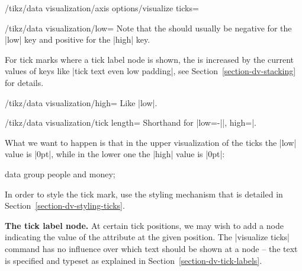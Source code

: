 \begin{key}{/tikz/data visualization/axis options/visualize ticks=}
\begin{itemize}
\begin{key}{/tikz/data visualization/low=}
                Note that the  should usually be negative for
                the |low| key and positive for the |high| key.

                For tick marks where a tick label node is shown, the
                 is increased by the current values of keys
                like |tick text even low padding|, see
                Section~\ref{section-dv-stacking} for details.
            \end{key}
            \begin{key}{/tikz/data visualization/high=}
                Like |low|.
            \end{key}
            \begin{key}{/tikz/data visualization/tick length=}
                Shorthand for |low=-||, high=|.
            \end{key}

            What we want to happen is that in the upper visualization of the
            ticks the |low| value is |0pt|, while in the lower one the |high|
            value is |0pt|:
\begin{codeexample}[preamble={\usetikzlibrary{datavisualization}}]
%
\tikz \datavisualization [
    our system,
    x axis={attribute=time, length=3cm, ticks=many},
    left axis ={attribute=money},
    right axis={attribute=people},
    visualize as line/.list={people 1, people 2, money 1, money 2}]
  data group {people and money};
\end{codeexample}
    \end{itemize}
    In order to style the tick mark, use the styling mechanism that is detailed
    in Section~\ref{section-dv-styling-ticks}.


    \medskip
    \textbf{The tick label node.}
    At certain tick positions, we may wish to add a node indicating the value
    of the attribute at the given position. The |visualize ticks| command has
    no influence over which text should be shown at a node -- the text is
    specified and typeset as explained in Section~\ref{section-dv-tick-labels}.


\end{key}
